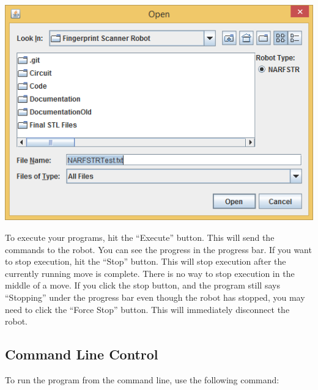 \documentclass[letterpaper,10pt,english]{sphinxmanual}
\begin{document}
\includegraphics{JavaProgramOpenWindow.PNG}

To execute your programs, hit the ``Execute'' button. This will send the commands to the robot. You can see the progress in the progress bar. If you want to stop execution, hit the ``Stop'' button. This will stop execution after the currently running move is complete. There is no way to stop execution in the middle of a move. If you click the stop button, and the program still says ``Stopping'' under the progress bar even though the robot has stopped, you may need to click the ``Force Stop'' button. This will immediately disconnect the robot.


\subsection{Command Line Control}
\label{Use:command-line-control}
To run the program from the command line, use the following command:
\end{document}
